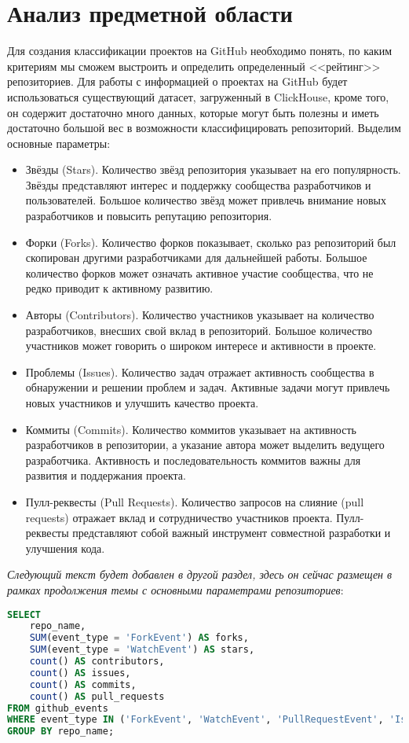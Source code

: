 \newpage
\section{Анализ предметной области}
\label{sec:Definition}

 Для создания классификации проектов на GitHub необходимо понять, по каким критериям мы сможем выстроить и определить определенный <<рейтинг>> репозиториев. Для работы с информацией о проектах на GitHub будет использоваться существующий датасет, загруженный в ClickHouse, кроме того, он содержит достаточно много данных, которые могут быть полезны и иметь достаточно большой вес в возможности классифицировать репозиторий. Выделим основные параметры:
 \begin{itemize}
     \item Звёзды (Stars). Количество звёзд  репозитория указывает на его популярность. Звёзды представляют интерес и поддержку сообщества разработчиков и пользователей. Большое количество звёзд может привлечь внимание новых разработчиков и повысить репутацию репозитория.
     \item Форки (Forks). Количество форков показывает, сколько раз репозиторий был скопирован другими разработчиками для дальнейшей работы. Большое количество форков может означать активное участие сообщества, что не редко приводит к активному развитию.
    \item Авторы (Contributors). Количество участников указывает на количество разработчиков, внесших свой вклад в репозиторий. Большое количество участников может говорить о широком интересе и активности в проекте.
    \item Проблемы (Issues). Количество задач отражает активность сообщества в обнаружении и решении проблем и задач. Активные задачи могут привлечь новых участников и улучшить качество проекта.
    \item Коммиты (Commits). Количество коммитов указывает на активность разработчиков в репозитории, а указание автора может выделить ведущего разработчика. Активность и последовательность коммитов важны для развития и поддержания проекта.
    \item Пулл-реквесты (Pull Requests). Количество запросов на слияние (pull requests) отражает вклад и сотрудничество участников проекта. Пулл-реквесты представляют собой важный инструмент совместной разработки и улучшения кода.
 \end{itemize}

 \textit{Следующий текст будет добавлен в другой раздел, здесь он сейчас размещен в рамках продолжения темы с основными параметрами репозиториев}:

\begin{lstlisting}[language=SQL, caption= Запрос на получение данных из датасета]
SELECT
    repo_name,
    SUM(event_type = 'ForkEvent') AS forks,
    SUM(event_type = 'WatchEvent') AS stars,
    count() AS contributors,
    count() AS issues,
    count() AS commits,
    count() AS pull_requests
FROM github_events
WHERE event_type IN ('ForkEvent', 'WatchEvent', 'PullRequestEvent', 'IssuesEvent', 'CommitCommentEvent', 'PullRequestEvent')
GROUP BY repo_name;
\end{lstlisting}